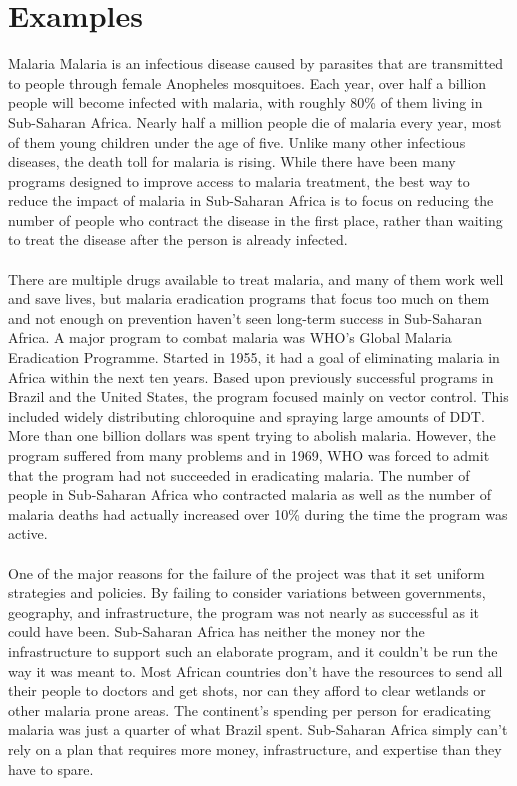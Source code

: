 \section{Examples}
\begin{mytcbox}{Malaria}
	Malaria is an infectious disease caused by parasites that are transmitted to people through female Anopheles mosquitoes. Each year, over half a billion people will become infected with malaria, with roughly 80\% of them living in Sub-Saharan Africa. Nearly half a million people die of malaria every year, most of them young children under the age of five. Unlike many other infectious diseases, the death toll for malaria is rising. While there have been many programs designed to improve access to malaria treatment, the best way to reduce the impact of malaria in Sub-Saharan Africa is to focus on reducing the number of people who contract the disease in the first place, rather than waiting to treat the disease after the person is already infected.
	\\
	\\
	There are multiple drugs available to treat malaria, and many of them work well and save lives, but malaria eradication programs that focus too much on them and not enough on prevention haven’t seen long-term success in Sub-Saharan Africa. A major program to combat malaria was WHO’s Global Malaria Eradication Programme. Started in 1955, it had a goal of eliminating malaria in Africa within the next ten years. Based upon previously successful programs in Brazil and the United States, the program focused mainly on vector control. This included widely distributing chloroquine and spraying large amounts of DDT. More than one billion dollars was spent trying to abolish malaria. However, the program suffered from many problems and in 1969, WHO was forced to admit that the program had not succeeded in eradicating malaria. The number of people in Sub-Saharan Africa who contracted malaria as well as the number of malaria deaths had actually increased over 10\% during the time the program was active.
	\\
	\\	
	One of the major reasons for the failure of the project was that it set uniform strategies and policies. By failing to consider variations between governments, geography, and infrastructure, the program was not nearly as successful as it could have been. Sub-Saharan Africa has neither the money nor the infrastructure to support such an elaborate program, and it couldn’t be run the way it was meant to. Most African countries don't have the resources to send all their people to doctors and get shots, nor can they afford to clear wetlands or other malaria prone areas. The continent’s spending per person for eradicating malaria was just a quarter of what Brazil spent. Sub-Saharan Africa simply can’t rely on a plan that requires more money, infrastructure, and expertise than they have to spare.

\end{mytcbox}
